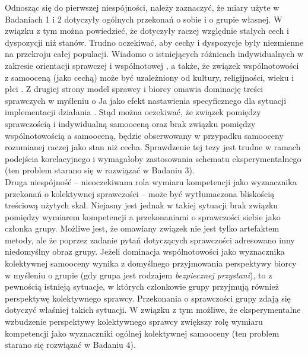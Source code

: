 \documentclass[man]{apa6}
\begin{document}
Odnosząc się do pierwszej niespójności, należy zaznaczyć, że miary użyte w Badaniach 1 i 2 dotyczyły ogólnych przekonań o sobie i o grupie własnej. W związku z tym można powiedzieć, że dotyczyły raczej względnie stałych cech i dyspozycji niż stanów. Trudno oczekiwać, aby cechy i dyspozycje były niezmienne na przekroju całej populacji. Wiadomo o istniejących różnicach indywidualnych w zakresie orientacji sprawczej i wspólnotowej \parencite{wojciszke2010skale}, a także, że związek wspólnotowości z samooceną (jako cechą) może być uzależniony od kultury, religijności, wieku i płci \parencite{gebauer2013agency}. Z drugiej strony model sprawcy i biorcy \parencite{wojciszke2011self} omawia dominację treści sprawczych w myśleniu o Ja jako efekt nastawienia specyficznego dla sytuacji implementacji działania \parencite{gollwitzer1997implementation}. Stąd można oczekiwać, że związek pomiędzy sprawczością i indywidualną samooceną oraz brak związku pomiędzy wspólnotowością a samooceną, będzie obserwowany w przypadku samooceny rozumianej raczej jako stan niż cecha. Sprawdzenie tej tezy jest trudne w ramach podejścia korelacyjnego i wymagałoby zastosowania schematu eksperymentalnego (ten problem starano się w rozwiązać w Badaniu 3).\\
Druga niespójność -- nieoczekiwana rola wymiaru kompetencji jako wyznacznika przekonań o kolektywnej sprawczości -- może być wytłumaczona bliskością treściową użytych skal. Niejasny jest jednak w takiej sytuacji brak związku pomiędzy wymiarem kompetencji a przekonaniami o sprawczości siebie jako członka grupy. Możliwe jest, że omawiany związek nie jest tylko artefaktem metody, ale że poprzez zadanie pytań dotyczących sprawczości adresowano inny niedomyślny obraz grupy. Jeżeli dominacja wspólnotowości jako wyznacznika kolektywnej samooceny wynika z domyślnego przyjmowania perspektywy biorcy w myśleniu o grupie (gdy grupa jest rodzajem \emph{bezpiecznej przystani}), to z pewnością istnieją sytuacje, w których członkowie grupy przyjmują również perspektywę kolektywnego sprawcy. Przekonania o sprawczości grupy zdają się dotyczyć właśniej takich sytuacji. W związku z tym możliwe, że eksperymentalne wzbudzenie perspektywy kolektywnego sprawcy zwiększy rolę wymiaru kompetencji jako wyznaczniki ogólnej kolektywnej samooceny (ten problem starano się rozwiązać w Badaniu 4).


\printbibliography
\end{document}
